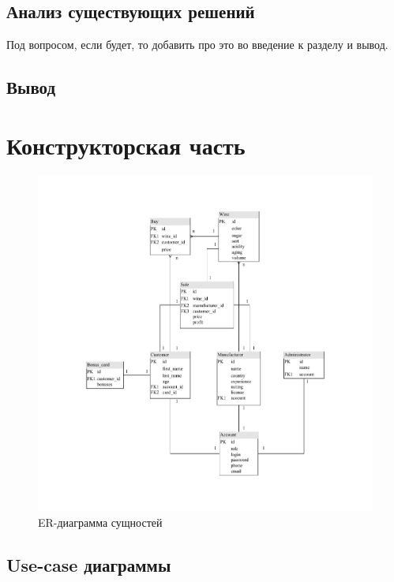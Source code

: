 \section{Анализ существующих решений}

Под вопросом, если будет, то добавить про это во введение к разделу и вывод.

\section{Вывод}

\chapter{Конструкторская часть}

\begin{figure}[H]
	\begin{center}
		\includegraphics[scale=0.75]{img/ER-diagram.pdf}
	\end{center}
	\captionsetup{justification=centering}
	\caption{ER-диаграмма сущностей}
	\label{img:er}
\end{figure}

\section{Use-case диаграммы}

